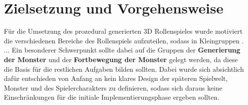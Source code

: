\section{Zielsetzung und Vorgehensweise}

Für die Umsetzung des prozedural generierten 3D Rollenspieles wurde motiviert die verschiedenen Bereiche des Rollenspiels aufzuteilen, sodass in Kleingruppen . ... Ein besonderer Schwerpunkt sollte dabei auf die Gruppen der \textbf{Generierung der Monster} und der \textbf{Fortbewegung der Monster} gelegt werden, da diese die Basis für die restlichen Aufgaben bilden sollten. Dabei wurde sich absichtlich dafür entschieden von Anfang an kein klares Design der späteren Spielwelt, Monster und des Spielercharakters zu definieren, sodass sich daraus keine Einschränkungen für die initiale Implementierungsphase ergeben sollten. 